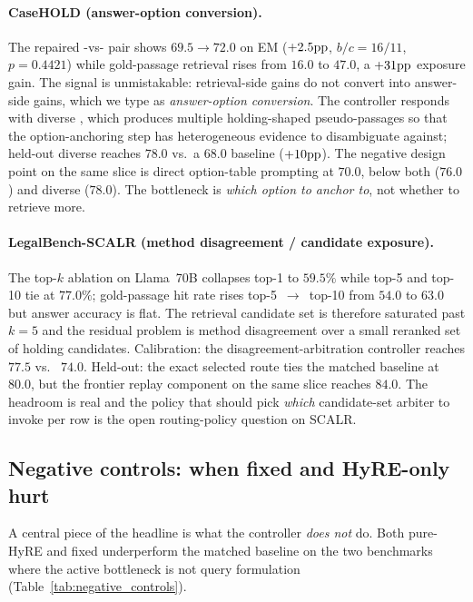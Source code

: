 \paragraph{CaseHOLD (answer-option conversion).}
The repaired -vs- pair shows
$69.5 \rightarrow 72.0$ on EM ($+2.5\mathrm{pp}$, $b/c=16/11$, $p=0.4421$)
while gold-passage retrieval rises from $16.0$ to $47.0$, a $+31\mathrm{pp}$
exposure gain. The signal is unmistakable: retrieval-side gains do not convert
into answer-side gains, which we type as \emph{answer-option conversion}. The
controller responds with diverse \hyre{}, which produces multiple
holding-shaped pseudo-passages so that the option-anchoring step has heterogeneous
evidence to disambiguate against; held-out diverse \hyre{} reaches $78.0$ vs.\ a
$68.0$ baseline ($+10\mathrm{pp}$). The negative design point on the same
slice is direct option-table prompting at $70.0$, below both
 ($76.0$) and diverse \hyre{} ($78.0$). The bottleneck is
\emph{which option to anchor to}, not whether to retrieve more.

\paragraph{LegalBench-SCALR (method disagreement / candidate exposure).}
The top-$k$ ablation on Llama~70B collapses top-1 to $59.5\%$ while top-5 and
top-10 tie at $77.0\%$; gold-passage hit rate rises top-5~$\rightarrow$~top-10
from $54.0$ to $63.0$ but answer accuracy is flat. The retrieval candidate set
is therefore saturated past $k{=}5$ and the residual problem is method
disagreement over a small reranked set of holding candidates. Calibration:
the disagreement-arbitration controller reaches $77.5$ vs.\ 
$74.0$. Held-out: the exact selected route ties the matched baseline at
$80.0$, but the frontier replay component on the same slice reaches $84.0$.
The headroom is real and the policy that should pick \emph{which} candidate-set
arbiter to invoke per row is the open routing-policy question on SCALR.

\subsection{Negative controls: when fixed \hyre{} and HyRE-only hurt}

A central piece of the headline is what the controller \emph{does not} do.
Both pure-HyRE and fixed \hyre{} underperform the matched baseline on the
two benchmarks where the active bottleneck is not query formulation
(Table~\ref{tab:negative_controls}).

